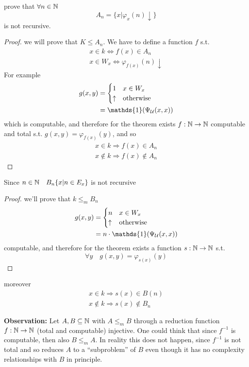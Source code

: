 \begin{example}
  prove that $\forall n \in \mathbb{N}$
  \[
    A_n = \{x  | \varphi_x (n) \downarrow\}
  \]
  is not recursive.

  \begin{proof}
    we will prove that $K \leq A_n$. We have to define a function $f$
    s.t.
    \begin{gather*}
      x \in k \Leftrightarrow f(x) \in A_n \\
      x \in W_x \Leftrightarrow \varphi_{f(x)}(n) \downarrow
    \end{gather*}
    For example
    \[
      \begin{split}
        g(x,y) &= \begin{cases}
          1 & x \in W_x \\
          \uparrow & \mbox{otherwise}
        \end{cases} \\
        &= \mathds{1}(\univ(x,x))
      \end{split}
    \]
    which is computable, and therefore for the \smn theorem exists
    $f: \mathbb{N} \to \mathbb{N}$ computable and total s.t.
    $g(x,y) = \varphi_{f(x)}(y)$, and so
    \begin{gather*}
      x \in k \Rightarrow f(x) \in A_n \\
      x \notin  k \Rightarrow f(x) \notin A_n
    \end{gather*}
  \end{proof}
\end{example}

\begin{example}
  Since $n \in \mathbb{N} \quad B_n\{ x | n \in E_x\}$ is not recursive
  \begin{proof}
    we'll prove that $k \leq_m B_n$
    \[
      \begin{split}
        g(x,y) &= \begin{cases}
          n & x \in W_x \\
          \uparrow & \mbox{otherwise}
        \end{cases} \\
        &= n \cdot \mathds{1}(\univ(x,x))
      \end{split}
    \]
    computable, and therefore for the \smn theorem exists a function
    $s : \mathbb{N} \to \mathbb{N}$ s.t.
    \[
      \forall y \quad g(x,y) = \varphi_{s(x)}(y)
    \]
  \end{proof}
  moreover
  \begin{gather*}
    x \in k \Rightarrow s(x) \in B(n) \\
    x \notin k \Rightarrow s(x) \notin B_n
  \end{gather*}
\end{example}

\textbf{Observation:} Let $A,B \subseteq \mathbb{N}$ with $A \leq_m B$
through a reduction function $f : \mathbb{N} \to \mathbb{N}$ (total and computable)
injective. One could think that since $f^{-1}$ is computable, then
also $B \leq_m A$. In reality this does not happen, since $f^{-1}$ is
not total and so reduces $A$ to a ``subproblem'' of $B$ even though
it has no complexity relationships with $B$ in principle.
